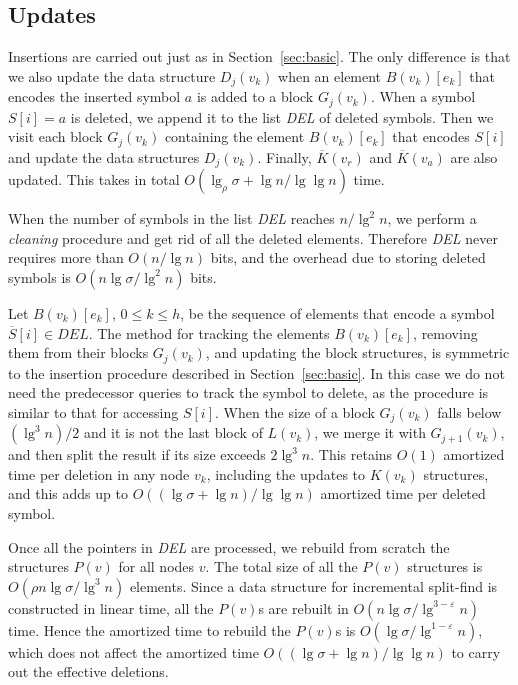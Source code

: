 \documentclass[11pt]{article}
\newcommand{\cP}{{ K}}
\newcommand{\oS}{\overline{S}}
\newcommand{\oP}{\overline{{ K}}}
\newcommand{\eps}{\varepsilon}
\begin{document}
\subsection{Updates} \label{sec:rankdel}

Insertions are carried out just as in Section~\ref{sec:basic}. 
The only difference is that we also update the data structure $D_j(v_k)$ when 
an element $B(v_k)[e_k]$ that encodes the inserted symbol $a$ is added to a block 
$G_j(v_k)$. When a symbol $S[i]=a$ is deleted, we append it to the list {\em DEL} of
deleted symbols. Then we visit each block $G_j(v_k)$ containing the element 
$B(v_k)[e_k]$ that encodes $S[i]$ and update the data structures $D_j(v_k)$. 
Finally, $\oP(v_r)$ and $\oP(v_a)$ are also updated. This takes in total
$O(\lg_\rho\sigma+\lg n/\lg\lg n)$ time.

When the number of symbols in the list {\em DEL} reaches
$n/\lg^2 n$, we perform a \emph{cleaning} procedure 
and get rid of all the deleted elements. Therefore {\em DEL} never requires
more than $O(n/\lg n)$ bits, and the overhead due to storing deleted symbols
is $O(n\lg\sigma/\lg^2 n)$ bits.

Let $B(v_k)[e_k]$, $0\le k\le h$, be the sequence of elements that encode 
a symbol $\oS[i]\in DEL$. The method for tracking the elements 
$B(v_k)[e_k]$, removing them from their blocks $G_j(v_k)$, 
and updating the block structures, is symmetric to the insertion procedure 
described in Section~\ref{sec:basic}.  
In this case we do not need the predecessor
queries to track the symbol to delete, as the procedure is similar to that
for accessing $S[i]$. When the size of a block $G_j(v_k)$ falls below
$(\lg^3 n)/2$ and it is not the last block of $L(v_k)$, we merge it with 
$G_{j+1}(v_k)$, and then split the result if its size exceeds $2\lg^3 n$.
This retains $O(1)$ amortized time per deletion in any node $v_k$, 
including the updates to $\cP(v_k)$ structures, and this adds up to
$O((\lg\sigma+\lg n)/\lg\lg n)$ amortized time per deleted symbol.

Once all the pointers in {\em DEL} are processed, we rebuild from scratch 
the structures $P(v)$ for all nodes $v$. The total size of all the
$P(v)$ structures is $O(\rho n\lg\sigma/\lg^3 n)$ elements. 
Since a data structure 
for incremental split-find is constructed in linear time, 
all the $P(v)$s are rebuilt in $O(n\lg\sigma/\lg^{3-\eps}n)$ time. 
Hence the amortized time to rebuild the $P(v)$s is 
$O(\lg\sigma/\lg^{1-\eps}n)$, which does not affect the amortized time
$O((\lg\sigma+\lg n) / \lg\lg n)$ to carry out the effective deletions.
\end{document}
